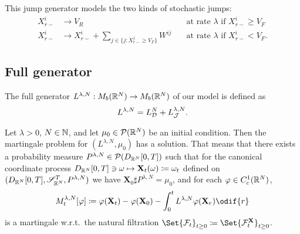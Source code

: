 \smallskip

This jump generator models the two kinds of stochastic jumps:
\begin{align}
  X_{r-}^i & \to V_R                                                           & \quad\text{at rate } \lambda \text{ if } X_{r-}^i \geq V_F \\
  X_{r-}^i & \to X_{r-}^i + \sum_{j \in \{j : X_{r-}^j \geq V_F\}} W^{ij} & \quad\text{at rate } \lambda \text{ if } X_{r-}^i < V_F.
\end{align}


\subsection{Full generator}

The full generator \(L^{\lambda, N} : M_b(\mathbb{R}^N) \to M_b(\mathbb{R}^N)\) of our model is defined as
\begin{equation}
  L^{\lambda, N} = L_{\mathcal{D}}^{N} + L_{\mathcal{J}}^{\lambda, N}.
\end{equation}


\begin{theorem}\label{thm:mart-problem-sol}
  Let \(\lambda > 0\), \( N \in \mathbb{N} \), and let \(\mu_0 \in \mathcal{P}(\mathbb{R}^N)\) be an initial condition.
  Then the martingale problem for \((L^{\lambda, N}, \mu_0)\) has a solution. %
  That means that there exists a probability measure \(P^{\lambda, N} \in \mathcal{P}(D_{\mathbb{R}^N}[0,T])\) such that for the canonical coordinate process \(D_{\mathbb{R}^N}[0,T] \ni \mathbf{\omega} \mapsto \mathbf{X}_t(\mathbf{\omega}) \coloneqq \mathbf{\omega}_t\) defined on \((D_{\mathbb{R}^N}[0,T], \mathscr{S}_{\mathbb{R}^N}^T, P^{\lambda, N})\) we have \( \bm{X}_0 \sharp P^{\lambda, N} = \mu_0 \), and for each \(\varphi \in C_c^1(\mathbb{R}^N)\), %
  \begin{equation}\label{eq:M-def}
    M_t^{\lambda, N}[\varphi]
    \coloneqq \varphi(\bm{X}_t) - \varphi(\bm{X}_0) - \int_0^t L^{\lambda, N} \varphi(\bm{X}_r) \odif{r}
  \end{equation}
  is a martingale w.r.t.\ the natural filtration \(\Set{\cF_t}_{t\geq0} \coloneqq \Set{\cF_t^\bm{X}}_{t\geq0}\).    %
\end{theorem}

